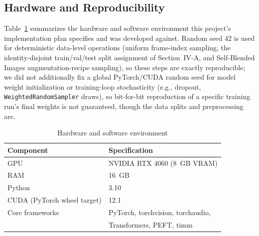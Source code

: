 \documentclass[conference]{IEEEtran}
\begin{document}
\subsection{Hardware and Reproducibility}
Table~\ref{tab:hardware} summarizes the hardware and software environment
this project's implementation plan specifies and was developed against.
Random seed 42 is used for deterministic data-level operations (uniform
frame-index sampling, the identity-disjoint train/val/test split
assignment of Section~IV-A, and Self-Blended Images augmentation-recipe
sampling), so these steps are exactly reproducible; we did not
additionally fix a global PyTorch/CUDA random seed for model weight
initialization or training-loop stochasticity (e.g., dropout,
\texttt{WeightedRandomSampler} draws), so bit-for-bit reproduction of a
specific training run's final weights is not guaranteed, though the data
splits and preprocessing are.

\begin{table}[t]
\caption{Hardware and software environment}
\label{tab:hardware}
\centering
\begin{tabular}{@{}ll@{}}
\toprule
Component & Specification \\
\midrule
GPU & NVIDIA RTX 4060 (8~GB VRAM) \\
RAM & 16~GB \\
Python & 3.10 \\
CUDA (PyTorch wheel target) & 12.1 \\
Core frameworks & PyTorch, torchvision, torchaudio,\\
                 & Transformers, PEFT, timm \\
\bottomrule
\end{tabular}
\end{table}
\end{document}
